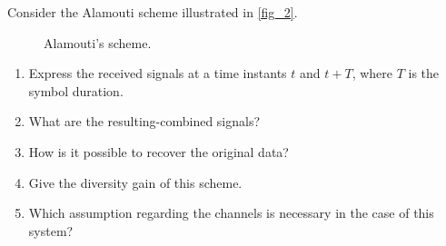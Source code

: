 \documentclass [a4paper, 11pt] {article}
\begin{document}
    \begin{exercise}{4}
    Consider the Alamouti scheme illustrated in \autoref{fig_2}.

    \begin{figure}[H]
    \centering
    
    \caption{Alamouti's scheme.}
    \label{fig_2}
    \end{figure}

    \begin{enumerate}
    \item Express the received signals at a time instants $t$ and $t + T$, where $T$ is the symbol duration.
    \item What are the resulting-combined signals?
    \item How is it possible to recover the original data?
    \item Give the diversity gain of this scheme.
    \item Which assumption regarding the channels is necessary in the case of this system?
    \end{enumerate}
    \end{exercise}
\end{document}
